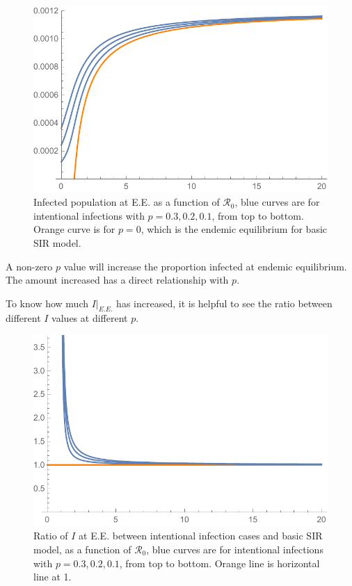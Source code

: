 \documentclass[12pt]{article}
\newcommand{\R}{\mathcal{R}}
\begin{document}
\begin{figure}[H]
  \caption{Infected population at E.E. as a function of $\R_0$, blue curves are for intentional infections with $p=0.3,0.2,0.1$, from top to bottom. Orange curve is for $p=0$, which is the endemic equilibrium for basic SIR model.}
  \centering
  \includegraphics[width=1.1\textwidth]{Figures/I_at_E_E_SIR_vs_Int.pdf}
\end{figure}

A non-zero $p$ value will increase the proportion infected at endemic equilibrium. The amount increased has a direct relationship with $p$. 

To know how much $I|_{E.E.}$ has increased, it is helpful to see the ratio between different $I$ values at different $p$.

\begin{figure}[H]
  \centering
  \includegraphics[width=1.1\textwidth]{Figures/I_at_E_E__Ratio_plot.pdf}
  \caption{Ratio of $I$ at E.E. between intentional infection cases and basic SIR model, as a function of $\R_0$, blue curves are for intentional infections with $p=0.3,0.2,0.1$, from top to bottom. Orange line is horizontal line at 1.}
\end{figure}
\end{document}

